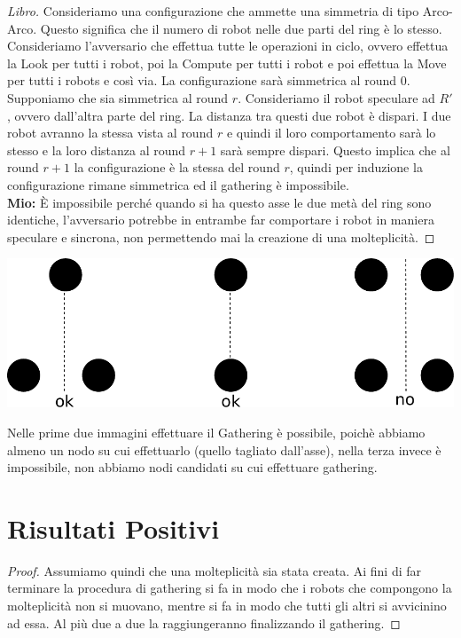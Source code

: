 
\begin{proof}
[Libro]Consideriamo una configurazione che ammette una simmetria di tipo Arco-Arco. Questo significa che il numero di robot nelle due parti del ring è lo stesso. Consideriamo l'avversario che effettua tutte le operazioni in ciclo, ovvero effettua la Look per tutti i robot, poi la Compute per tutti i robot e poi effettua la Move per tutti i robots e così via. La configurazione sarà simmetrica al round 0. Supponiamo che sia simmetrica al round $r$. Consideriamo il robot speculare ad $R'$, ovvero dall'altra parte del ring. La distanza tra questi due robot è dispari. I due robot avranno la stessa vista al round $r$ e quindi il loro comportamento sarà lo stesso e la loro distanza al round $r+1$ sarà sempre dispari. Questo implica che al round $r+1$ la configurazione è la stessa del round $r$, quindi per induzione la configurazione rimane simmetrica ed il gathering è impossibile.\\
\textbf{Mio: } \`E impossibile perché quando si ha questo asse le due metà del ring sono identiche, l'avversario potrebbe in entrambe far comportare i robot in maniera speculare e sincrona, non permettendo mai la creazione di una molteplicità. %
\end{proof}\newpage
\begin{center}
  \includegraphics[scale=0.7]{images/n_48}
\end{center}

Nelle prime due immagini effettuare il Gathering è possibile, poichè abbiamo almeno un nodo su cui effettuarlo (quello tagliato dall'asse), nella terza invece è impossibile, non abbiamo nodi candidati su cui effettuare gathering.\\

\section{Risultati Positivi}
\begin{proof}
Assumiamo quindi che una molteplicità sia stata creata. Ai fini di far terminare la procedura di gathering si fa in modo che i robots che compongono la molteplicità non si muovano, mentre si fa in modo che tutti gli altri si avvicinino ad essa. Al più due a due la raggiungeranno finalizzando il gathering.
\end{proof}

